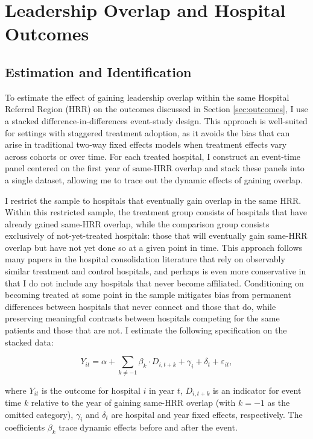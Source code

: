 \documentclass[12pt]{article}
\begin{document}
    \section{Leadership Overlap and Hospital Outcomes}\label{sec:outcome_results}

    \subsection{Estimation and Identification}

    To estimate the effect of gaining leadership overlap within the same Hospital Referral Region (HRR) on the outcomes discussed in Section \ref{sec:outcomes}, I use a stacked difference-in-differences event-study design. This approach is well-suited for settings with staggered treatment adoption, as it avoids the bias that can arise in traditional two-way fixed effects models when treatment effects vary across cohorts or over time. For each treated hospital, I construct an event-time panel centered on the first year of same-HRR overlap and stack these panels into a single dataset, allowing me to trace out the dynamic effects of gaining overlap.

    I restrict the sample to hospitals that eventually gain overlap in the same HRR. Within this restricted sample, the treatment group consists of hospitals that have already gained same-HRR overlap, while the comparison group consists exclusively of not-yet-treated hospitals: those that will eventually gain same-HRR overlap but have not yet done so at a given point in time. This approach follows many papers in the hospital consolidation literature that rely on observably similar treatment and control hospitals, and perhaps is even more conservative in that I do not include any hospitals that never become affiliated. Conditioning on becoming treated at some point in the sample mitigates bias from permanent differences between hospitals that never connect and those that do, while preserving meaningful contrasts between hospitals competing for the same patients and those that are not. I estimate the following specification on the stacked data:

    \begin{equation}\label{eq:stacked}
    Y_{it} = \alpha + \sum_{k \neq -1} \beta_k \cdot D_{i,t+k} + \gamma_i + \delta_t + \varepsilon_{it},
    \end{equation}

    \noindent where $Y_{it}$ is the outcome for hospital $i$ in year $t$, $D_{i,t+k}$ is an indicator for event time $k$ relative to the year of gaining same-HRR overlap (with $k = -1$ as the omitted category), $\gamma_i$ and $\delta_t$ are hospital and year fixed effects, respectively. The coefficients $\beta_k$ trace dynamic effects before and after the event.
\end{document}
